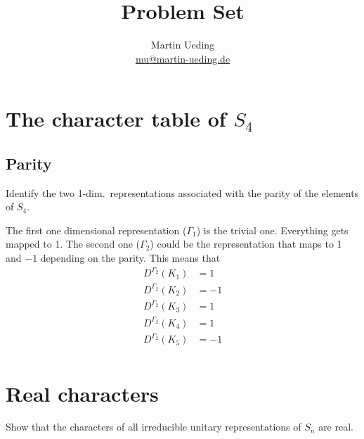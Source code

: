 \documentclass[11pt, english, fleqn, DIV=15, headinclude, BCOR=1cm]{scrartcl}
\title{Problem Set \arabic{problemset}}
\author{
    Martin Ueding \\ \small{\href{mailto:mu@martin-ueding.de}{mu@martin-ueding.de}}
}
\begin{document}
\maketitle

\section{The character table of $S_4$}

\subsection{Parity}

\begin{problem}
    Identify the two 1-dim.\ representations associated with the parity of the
    elements of $S_4$.
\end{problem}

The first one dimensional representation ($\Gamma_1$) is the trivial one.
Everything gets mapped to 1. The second one ($\Gamma_2$) could be the
representation that maps to 1 and $-1$ depending on the parity. This means that
\begin{align*}
    D^{\Gamma_2}(K_1)& = 1 \\
    D^{\Gamma_2}(K_2)& = -1 \\
    D^{\Gamma_2}(K_3)& = 1 \\
    D^{\Gamma_2}(K_4)& = 1 \\
    D^{\Gamma_2}(K_5)& = -1 \\
\end{align*}

\section{Real characters}

\begin{problem}
    Show that the characters of all irreducible unitary representations of
    $S_n$ are real.
\end{problem}
\end{document}

